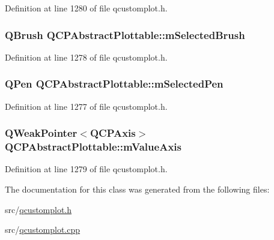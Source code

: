 Definition at line 1280 of file qcustomplot.\-h.

\hypertarget{class_q_c_p_abstract_plottable_aea3c0da30c7a8be23ad5f2d9bca36762}{
\subsubsection[{m\-Selected\-Brush}]{\setlength{\rightskip}{0pt plus 5cm}Q\-Brush Q\-C\-P\-Abstract\-Plottable\-::m\-Selected\-Brush\hspace{0.3cm}{\ttfamily [protected]}}}\label{class_q_c_p_abstract_plottable_aea3c0da30c7a8be23ad5f2d9bca36762}


Definition at line 1278 of file qcustomplot.\-h.

\hypertarget{class_q_c_p_abstract_plottable_a10619472f5d5e10e9519a599f1cf5576}{
\subsubsection[{m\-Selected\-Pen}]{\setlength{\rightskip}{0pt plus 5cm}Q\-Pen Q\-C\-P\-Abstract\-Plottable\-::m\-Selected\-Pen\hspace{0.3cm}{\ttfamily [protected]}}}\label{class_q_c_p_abstract_plottable_a10619472f5d5e10e9519a599f1cf5576}


Definition at line 1277 of file qcustomplot.\-h.

\hypertarget{class_q_c_p_abstract_plottable_a1fce3d77798fff4d7501fbc43568b144}{
\subsubsection[{m\-Value\-Axis}]{\setlength{\rightskip}{0pt plus 5cm}Q\-Weak\-Pointer$<${\bf Q\-C\-P\-Axis}$>$ Q\-C\-P\-Abstract\-Plottable\-::m\-Value\-Axis\hspace{0.3cm}{\ttfamily [protected]}}}\label{class_q_c_p_abstract_plottable_a1fce3d77798fff4d7501fbc43568b144}


Definition at line 1279 of file qcustomplot.\-h.



The documentation for this class was generated from the following files\-:\begin{DoxyCompactItemize}
\item 
src/\hyperlink{qcustomplot_8h}{qcustomplot.\-h}\item 
src/\hyperlink{qcustomplot_8cpp}{qcustomplot.\-cpp}\end{DoxyCompactItemize}
